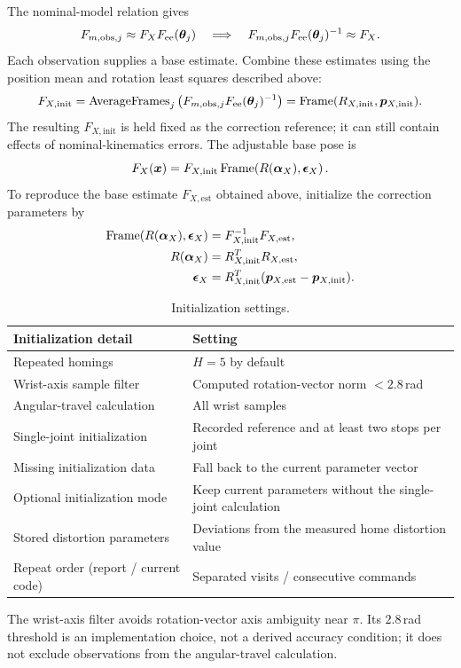 \documentclass[../main.tex]{subfiles}
\begin{document}
The nominal-model relation gives
\begin{equation*}
F_{m,\mathrm{obs},j}\approx F_XF_{\mathrm{ee}}(\bm{\theta}_j)
\quad\Longrightarrow\quad
F_{m,\mathrm{obs},j}F_{\mathrm{ee}}(\bm{\theta}_j)^{-1}\approx F_X.
\end{equation*}
Each observation supplies a base estimate. Combine these estimates using the position mean and rotation least squares described above:
\begin{equation*}
F_{X,\mathrm{init}}
=\operatorname{AverageFrames}_j
\left(F_{m,\mathrm{obs},j}F_{\mathrm{ee}}(\bm{\theta}_j)^{-1}\right)
=\operatorname{Frame}(R_{X,\mathrm{init}},\bm{p}_{X,\mathrm{init}}).
\end{equation*}
The resulting $F_{X,\mathrm{init}}$ is held fixed as the correction reference; it can still contain effects of nominal-kinematics errors. The adjustable base pose is
\begin{equation*}
F_X(\bm{x})=F_{X,\mathrm{init}}
\operatorname{Frame}\!\left(R(\bm{\alpha}_X),\bm{\epsilon}_X\right).
\end{equation*}
To reproduce the base estimate $F_{X,\mathrm{est}}$ obtained above, initialize the correction parameters by
\begin{equation*}
\begin{aligned}
\operatorname{Frame}\!\left(R(\bm{\alpha}_X),\bm{\epsilon}_X\right)
&=F_{X,\mathrm{init}}^{-1}F_{X,\mathrm{est}},\\
R(\bm{\alpha}_X)&=R_{X,\mathrm{init}}^TR_{X,\mathrm{est}},\\
\bm{\epsilon}_X&=R_{X,\mathrm{init}}^T
(\bm{p}_{X,\mathrm{est}}-\bm{p}_{X,\mathrm{init}}).
\end{aligned}
\end{equation*}

\begin{table}[H]
\centering\small
\begin{tabular}{@{}ll@{}}
\toprule
Initialization detail & Setting \\\midrule
Repeated homings & $H=5$ by default \\
Wrist-axis sample filter & Computed rotation-vector norm $<2.8$\,rad \\
Angular-travel calculation & All wrist samples \\
Single-joint initialization & Recorded reference and at least two stops per joint \\
Missing initialization data & Fall back to the current parameter vector \\
Optional initialization mode & Keep current parameters without the single-joint calculation \\
Stored distortion parameters & Deviations from the measured home distortion value \\
Repeat order (report / current code) & Separated visits / consecutive commands \\
\bottomrule
\end{tabular}
\caption{Initialization settings.}
\end{table}
The wrist-axis filter avoids rotation-vector axis ambiguity near $\pi$. Its $2.8$\,rad threshold is an implementation choice, not a derived accuracy condition; it does not exclude observations from the angular-travel calculation.
\end{document}
